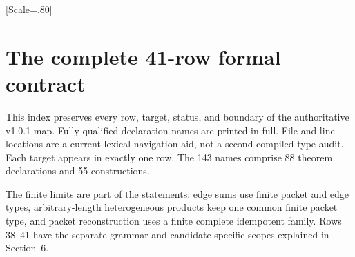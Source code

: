 

\usepackage{komorebi-monograph}
\renewcommand{\KomorebiKind}{Lean and evidence guide}
\renewcommand{\KomorebiShortTitle}{Paper III / Lean guide}
\renewcommand{\KomorebiCoverBlurb}{Read the exact source declarations, follow the map directions, and follow the current kernel verification and the preserved finite theorem map.}
\KomorebiSetup
\setmonofont{DejaVu Sans Mono}[Scale=.80]

\KomorebiCover
{}


\tableofcontents
\clearpage
{}

\clearpage







\clearpage
\section{The complete 41-row formal contract}\label{sec:map}
This index preserves every row, target, status, and boundary of the authoritative v1.0.1 map. Fully qualified declaration names are printed in full. File and line locations are a current lexical navigation aid, not a second compiled type audit. Each target appears in exactly one row. The 143 names comprise 88 theorem declarations and 55 constructions.

The finite limits are part of the statements: edge sums use finite packet and edge types, arbitrary-length heterogeneous products keep one common finite packet type, and packet reconstruction uses a finite complete idempotent family. Rows 38--41 have the separate grammar and candidate-specific scopes explained in Section~6.

\clearpage
\appendix
